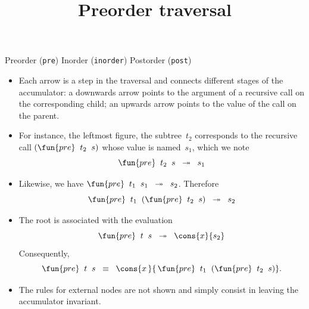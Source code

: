 \documentclass[wide]{slides}
\begin{document}
\begin{slide}
\begin{itemize}
\begin{center}
      \end{center}
      \centerline{Preorder (\texttt{pre}) \qquad\qquad
      Inorder (\texttt{inorder}) \qquad Postorder (\texttt{post})}

  \end{itemize}

\end{slide}

\begin{slide}
  \title{Preorder traversal}

  \begin{itemize}

    \item Each arrow is a step in the traversal and connects different
      stages of the accumulator: a downwards arrow points to the
      argument of a recursive call on the corresponding child; an
      upwards arrow points to the value of the call on the parent.

    \item For instance, the leftmost figure, the subtree~\(t_2\)
      corresponds to the recursive call \((\fun{pre} \;\; t_2 \;\;
      s)\) whose value is named~\(s_1\), which we note
      \begin{equation*}
        \fun{pre} \;\; t_2 \;\; s \;\; \twoheadrightarrow \;\; s_1
      \end{equation*}

    \item Likewise, we have \(\fun{pre} \;\; t_1 \;\; s_1 \;\;
      \twoheadrightarrow \;\; s_2\). Therefore
      \begin{equation*}
        \fun{pre} \;\; t_1 \;\; (\fun{pre} \;\; t_2 \;\; s) \;\;
        \twoheadrightarrow \;\; s_2
      \end{equation*}

    \item The root is associated with the evaluation
      \begin{equation*}
        \fun{pre} \;\;
        t \;\; s \;\; \twoheadrightarrow \;\; \cons{x}{s_2}
      \end{equation*}
      Consequently,
      \begin{equation*}
        \fun{pre} \;\; t \;\; s \;\; \equiv \;\;
        \cons{x\,}{\,\fun{pre} \;\; t_1 \;\; (\fun{pre} \;\; t_2 \;\;
          s)}.
      \end{equation*}

    \item The rules for external nodes are not shown and simply
      consist in leaving the accumulator invariant.

  \end{itemize}

\end{slide}
\end{document}
